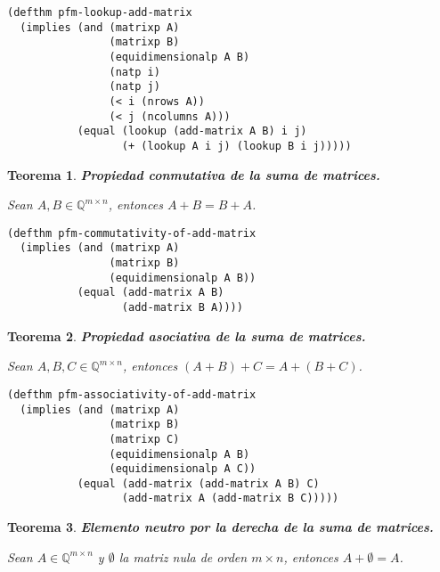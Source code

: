 \documentclass[a4paper,10pt]{article}
\newcommand{\M}[3]{#1 \in \mathbb{Q}^{#2 \times #3}}
\newtheorem{teor}{{Teorema}}
\begin{document}
\begin{lstlisting}[language=clips]
(defthm pfm-lookup-add-matrix
  (implies (and (matrixp A)
                (matrixp B)
                (equidimensionalp A B)
                (natp i)
                (natp j)
                (< i (nrows A))
                (< j (ncolumns A)))
           (equal (lookup (add-matrix A B) i j)
                  (+ (lookup A i j) (lookup B i j)))))
\end{lstlisting}

\par \vspace{16pt}

\begin{teor} \textbf{Propiedad conmutativa de la suma de matrices.}\vspace{8pt}\par
Sean $\M{A,B}{m}{n}$, entonces $A + B = B + A$.
\end{teor}

\begin{lstlisting}[language=clips]
(defthm pfm-commutativity-of-add-matrix
  (implies (and (matrixp A)
                (matrixp B)
                (equidimensionalp A B))
           (equal (add-matrix A B)
                  (add-matrix B A))))
\end{lstlisting}

\par \vspace{16pt}

\begin{teor} \textbf{Propiedad asociativa de la suma de matrices.}\vspace{8pt}\par
Sean $\M{A,B,C}{m}{n}$, entonces $(A + B) + C = A + (B + C)$.
\end{teor}

\begin{lstlisting}[language=clips]
(defthm pfm-associativity-of-add-matrix
  (implies (and (matrixp A)
                (matrixp B)
                (matrixp C)
                (equidimensionalp A B)
                (equidimensionalp A C))
           (equal (add-matrix (add-matrix A B) C)
                  (add-matrix A (add-matrix B C)))))
\end{lstlisting}

\par \vspace{16pt}

\begin{teor} \textbf{Elemento neutro por la derecha de la suma de matrices.}\vspace{8pt}\par
Sean $\M{A}{m}{n}$ y $\emptyset$ la matriz nula de orden $m \times n$, entonces $A + \emptyset = A$.
\end{teor}
\end{document}
